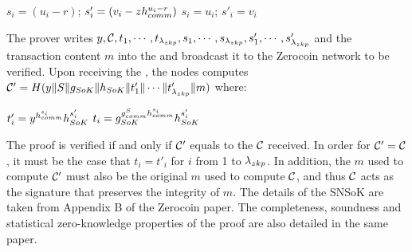 \begin{algorithm}
	\begin{algorithmic}[H]
		\State $s_i=(u_i-r)$; $s'_i=(v_i-zh_{comm}^{u_i-r})$ 
		\Else
		\State $s_i=u_i$; $s'_i=v_i$
		\EndIf
		\EndFor
	\end{algorithmic}
\end{algorithm}	

The prover writes $y,\mathcal{C},t_1,\cdots,t_{\lambda_{zkp}},s_1,\cdots,s_{\lambda_{zkp}},s'_1,\cdots,s'_{\lambda_{zkp}}$ and the transaction content $m$ into the  and broadcast it to the Zerocoin network to be verified. Upon receiving the , the nodes computes $\mathcal{C}'=H(y \| S \| g_{SoK} \| h_{SoK} \| t'_1 \| \cdots \| t'_{\lambda_{zkp}} \| m)$ where:

\begin{algorithm}
	\begin{algorithmic}[H]
		\State $t'_i=y^{h_{comm}^{s_i}}h_{SoK}^{s'_i}$ 
		\Else
		\State $t_i=g_{SoK}^{g_{comm}^{S}h_{comm}^{s_i}}h_{SoK}^{s'_i}$
		\EndIf
		\EndFor
	\end{algorithmic}
\end{algorithm}	

The proof is verified if and only if $\mathcal{C}'$ equals to the $\mathcal{C}$ received. In order for $\mathcal{C}'=\mathcal{C}$, it must be the case that $t_i=t'_i$ for $i$ from 1 to $\lambda_{zkp}$. In addition, the $m$ used to compute $\mathcal{C}'$ must also be the original $m$ used to compute $\mathcal{C}$, and thus $\mathcal{C}$ acts as the signature that preserves the integrity of $m$. The details of the SNSoK are taken from Appendix B of the Zerocoin paper. The completeness, soundness and statistical zero-knowledge properties of the proof are also detailed in the same paper.

